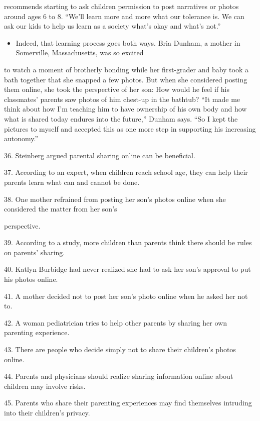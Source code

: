 \documentclass[UTF8,11pt]{ctexart}
\begin{document}
recommends starting to ask children permission to post narratives or photos around ages 6 to 8. “We’ll learn more and more what our tolerance is. We can ask our kids to help us learn as a society what’s okay and what’s not.”


\begin{itemize}[leftmargin=2em,itemsep=.2em,topsep=.4em]\item[N.] Indeed, that learning process goes both ways. Bria Dunham, a mother in Somerville, Massachusetts, was so excited
\end{itemize}

to watch a moment of brotherly bonding while her first-grader and baby took a bath together that she snapped a few photos. But when she considered posting them online, she took the perspective of her son: How would he feel if his classmates’ parents saw photos of him chest-up in the bathtub? “It made me think about how I’m teaching him to have ownership of his own body and how what is shared today endures into the future,” Dunham says. “So I kept the pictures to myself and accepted this as one more step in supporting his increasing autonomy.”


36. Steinberg argued parental sharing online can be beneficial.


37. According to an expert, when children reach school age, they can help their parents learn what can and cannot be done.


38. One mother refrained from posting her son’s photos online when she considered the matter from her son’s


perspective.


39. According to a study, more children than parents think there should be rules on parents’ sharing.


40. Katlyn Burbidge had never realized she had to ask her son’s approval to put his photos online.


41. A mother decided not to post her son’s photo online when he asked her not to.


42. A woman pediatrician tries to help other parents by sharing her own parenting experience.


43. There are people who decide simply not to share their children’s photos online.


44. Parents and physicians should realize sharing information online about children may involve risks.


45. Parents who share their parenting experiences may find themselves intruding into their children’s privacy.
\end{document}
